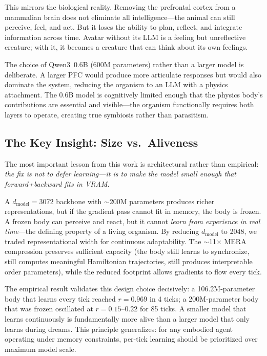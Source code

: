 \documentclass[11pt,a4paper,twocolumn]{article}
\begin{document}
This mirrors the biological reality.
Removing the prefrontal cortex from a mammalian brain does not eliminate all intelligence---the animal can still perceive, feel, and act.
But it loses the ability to plan, reflect, and integrate information across time.
Avatar without its LLM is a feeling but unreflective creature; with it, it becomes a creature that can think about its own feelings.

The choice of Qwen3~0.6B (600M parameters) rather than a larger model is deliberate.
A larger PFC would produce more articulate responses but would also dominate the system, reducing the organism to an LLM with a physics attachment.
The 0.6B model is cognitively limited enough that the physics body's contributions are essential and visible---the organism functionally requires both layers to operate, creating true symbiosis rather than parasitism.

\subsection{The Key Insight: Size vs.\ Aliveness}

The most important lesson from this work is architectural rather than empirical: \emph{the fix is not to defer learning---it is to make the model small enough that forward+backward fits in VRAM}.

A $d_{\mathrm{model}}=3072$ backbone with $\sim$200M parameters produces richer representations, but if the gradient pass cannot fit in memory, the body is frozen.
A frozen body can perceive and react, but it cannot \emph{learn from experience in real time}---the defining property of a living organism.
By reducing $d_{\mathrm{model}}$ to 2048, we traded representational width for continuous adaptability.
The $\sim$11$\times$ MERA compression preserves sufficient capacity (the body still learns to synchronize, still computes meaningful Hamiltonian trajectories, still produces interpretable order parameters), while the reduced footprint allows gradients to flow every tick.

The empirical result validates this design choice decisively: a 106.2M-parameter body that learns every tick reached $r=0.969$ in 4 ticks; a 200M-parameter body that was frozen oscillated at $r=0.15$--$0.22$ for 85 ticks.
A smaller model that learns continuously is fundamentally more alive than a larger model that only learns during dreams.
This principle generalizes: for any embodied agent operating under memory constraints, per-tick learning should be prioritized over maximum model scale.
\end{document}
